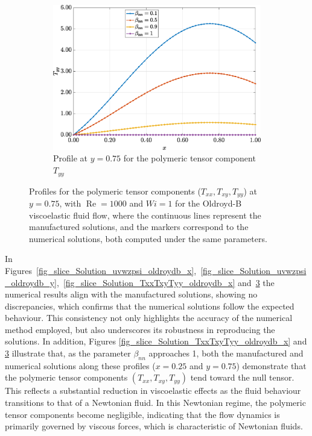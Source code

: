\documentclass[preprint, 12pt]{elsarticle}
\begin{document}
\begin{figure}[H]
\begin{subfigure}[b]{.46\textwidth}
        \label{fig_slice_y_txy_2nd_Case1_oldorydb}
    \end{subfigure}
    \begin{subfigure}[b]{.46\textwidth}
        \includegraphics[width=\textwidth]{Slice_y_Tog_Numerical_NormErr_2nd_Betann_1_Re_1000_Wi_1_epsilon_0_xi_0_alphaG_0_Dt_1e-06_at_0.05_tipsim_1_MMS_12_x0.75y0.75_Tyy.eps}
        \caption{Profile at $y=0.75$ for the polymeric tensor component $T_{yy}$}
        \label{fig_slice_y_tyy_2nd_Case1_oldorydb}
    \end{subfigure}
    \vspace{0.02cm}
    \caption{Profiles for the polymeric tensor components ($T_{xx}, T_{xy}, T_{yy}$) at $y=0.75$, with $\operatorname{Re}=1000$ and $Wi=1$ for the Oldroyd-B viscoelastic fluid flow, where the continuous lines represent the manufactured solutions, and the markers correspond to the numerical solutions, both computed under the same parameters.\label{fig_slice_Solution_TxxTxyTyy_oldroydb_y}}
\end{figure}

In Figures~\ref{fig_slice_Solution_uvwzpsi_oldroydb_x},~\ref{fig_slice_Solution_uvwzpsi_oldroydb_y},~\ref{fig_slice_Solution_TxxTxyTyy_oldroydb_x} and~\ref{fig_slice_Solution_TxxTxyTyy_oldroydb_y} the numerical results align with the manufactured solutions, showing no discrepancies, which confirms that the numerical solutions follow the expected behaviour. This consistency not only highlights the accuracy of the numerical method employed, but also underscores its robustness in reproducing the solutions. In addition, Figures \ref{fig_slice_Solution_TxxTxyTyy_oldroydb_x} and \ref{fig_slice_Solution_TxxTxyTyy_oldroydb_y} illustrate that, as the parameter $\beta_{nn}$ approaches 1, both the manufactured and numerical solutions along these profiles ($x=0.25$ and $y=0.75$) demonstrate that the polymeric tensor components $(T_{xx}, T_{xy}, T_{yy})$ tend toward the null tensor. This reflects a substantial reduction in viscoelastic effects as the fluid behaviour transitions to that of a Newtonian fluid. In this Newtonian regime, the polymeric tensor components become negligible, indicating that the flow dynamics is primarily governed by viscous forces, which is characteristic of Newtonian fluids.
\end{document}
